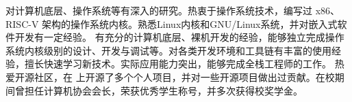 \documentclass[zh]{resume}
\begin{document}
\makeheader

{\onehalfspacing
\hspace{2em}
对计算机底层、操作系统等有深入的研究。热衷于操作系统技术，编写过 x86、RISC-V 架构的操作系统内核。熟悉Linux内核和GNU/Linux系统，并对嵌入式软件开发有一定经验。 
有充分的计算机底层、裸机开发的经验，能够独立完成操作系统内核级别的设计、开发与调试等。对各类开发环境和工具链有丰富的使用经验，擅长快速学习新技术。实际应用能力突出，能够完成全栈工程师的工作。
热爱开源社区，在 上开源了多个个人项目，并对一些开源项目做出过贡献。在校期间曾担任计算机协会会长，荣获优秀学生称号，并多次获得校奖学金。
\par}


\begin{competences}[7em]
\end{competences}


\end{document}
